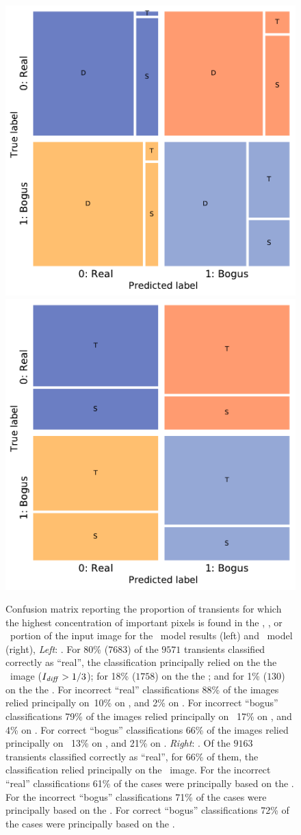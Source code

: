 


\begin{figure}
        \centering
    \includegraphics[width=0.45\linewidth]{
    figures/confusionmatrix_NERSCsaliencyDIA_100K20KNERSCstam0-9CCCC_3s3DH.pdf}
     \includegraphics[width=0.45\linewidth]{
    figures/confusionmatrix_NERSCsaliencynoDIA_100K20KNERSCstam0-9CCCC_3s2DH.pdf}
    \caption{Confusion matrix reporting the proportion of transients for which the highest concentration of important pixels is found in the \diff, \search, or \temp\ portion of the input image for the \diabased\ model results (left) and \nodia\ model (right), {\it Left}: \diabased. For 80\% ($7683$) of the $9571$ transients classified correctly as ``real'', the classification principally relied on the the \diff\ image ($I_{\it diff} > 1/3$); for 18\% ($1758$) on the the \search ;  and for 1\% ($130$) on the the \temp . For incorrect ``real'' classifications 88\% of the images relied principally on \diff\,10\% on \search, and 2\% on \temp. For incorrect ``bogus'' classifications 79\% of the images relied principally on \diff\, 17\% on \search, and 4\% on \temp. For correct ``bogus'' classifications 66\% of the images relied principally on \diff\, 13\% on \search, and 21\% on \temp. {\it Right}: \nodia. Of the $9163$ transients classified correctly as ``real'', for 66\% of them, the classification relied principally on the \temp\ image. For the incorrect ``real'' classifications 61\% of the cases were principally based on the \temp. For the incorrect ``bogus'' classifications 71\% of the cases were principally based on the \temp. For correct ``bogus'' classifications 72\% of the cases were principally based on the \temp. }

\end{figure}
